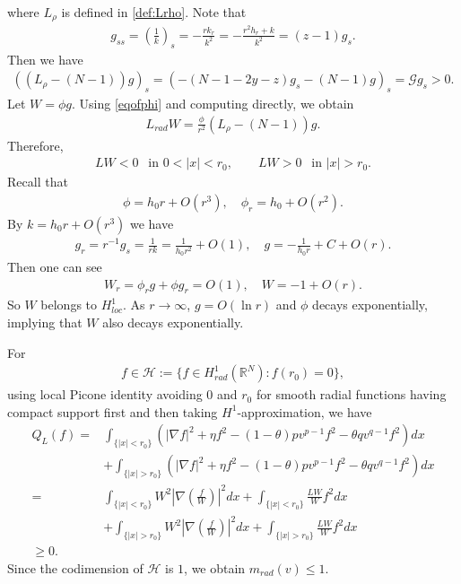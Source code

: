 \documentclass{article}
\theoremstyle{definition} \theoremstyle{remark}
\numberwithin{equation}{section}
\newcommand{\R}{\mathbb{R}}
\newcommand{\G}{\mathcal{G}}
\begin{document}
	where $L_\rho$ is defined in \eqref{def:Lrho}. Note that
	\begin{align*}
		g_{ss} = \left(\frac{1}{k}\right)_s = -\frac{rk_r}{k^2}=-\frac{r^2h_r + k}{k^2} = (z-1)g_s.
	\end{align*}
	Then we have
	\begin{align*}
		\left(\left(L_\rho - (N-1)\right)g\right)_s = \left(-(N-1-2y-z)g_s - (N-1)g\right)_s = \G g_s > 0.
	\end{align*}
	Let $W = \phi g$. Using \eqref{eqofphi} and computing directly, we obtain
	\begin{align*}
		L_{rad}W = \frac{\phi}{r^2}\left(L_\rho - (N-1)\right)g.
	\end{align*}
	Therefore,
	\begin{align*}
		LW < 0 ~~ \text{ in } 0 < |x| < r_0, \quad\quad LW > 0 ~~ \text{ in } |x| > r_0.
	\end{align*}
Recall that
	\begin{align*}
		\phi = h_0r + O(r^3), \quad \phi_r = h_0 + O(r^2).
	\end{align*}
	By $k = h_0r + O(r^3)$ we have
	\begin{align*}
		g_r = r^{-1}g_s = \frac{1}{rk} = \frac{1}{h_0r^2} + O(1), \quad g = -\frac{1}{h_0r} + C + O(r).
	\end{align*}
	Then one can see
	\begin{align*}
		W_r = \phi_r g + \phi g_r = O(1), \quad W = -1 + O(r).
	\end{align*}
	So $W$ belongs to $H_{loc}^1$. As $r \to \infty$, $g = O(\ln r)$ and $\phi$ decays exponentially, implying that $W$ also decays exponentially.
	
	For
	\begin{align*}
		f \in \mathcal{H} := \big\{f \in H_{rad}^1(\R^N): f(r_0) = 0\big\},
	\end{align*}
	using local Picone identity avoiding $0$ and $r_0$ for smooth radial functions having compact support first and then taking $H^1$-approximation, we have
	\begin{align*}
		Q_L(f) = & \int_{\{|x| < r_0\}}\left(|\nabla f|^2 + \eta f^2 - (1-\theta)pv^{p-1}f^2 - \theta q v^{q-1}f^2\right)dx \\
		& + \int_{\{|x| > r_0\}}\left(|\nabla f|^2 + \eta f^2 - (1-\theta)pv^{p-1}f^2 - \theta q v^{q-1}f^2\right)dx \\
		= & \int_{\{|x| < r_0\}}W^2\left|\nabla \left(\frac{f}{W}\right)\right|^2dx + \int_{\{|x| < r_0\}}\frac{LW}{W}f^2dx \\
		& + \int_{\{|x| > r_0\}}W^2\left|\nabla \left(\frac{f}{W}\right)\right|^2dx + \int_{\{|x| > r_0\}}\frac{LW}{W}f^2dx \\
		\ge 0.
	\end{align*}
	Since the codimension of $\mathcal{H}$ is $1$, we obtain $m_{rad}(v) \le 1$.
\end{document}
